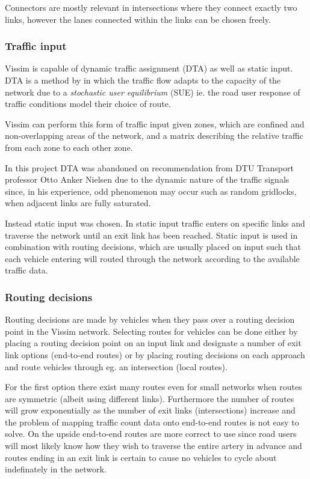 Connectors are mostly relevant in intersections where they connect exactly two links, however the lanes connected within the links can be chosen freely.

\subsubsection*{Traffic input}
Vissim is capable of dynamic traffic assignment (DTA) as well as static input. DTA is a method by \cite{Wardrop} in which the traffic flow adapts to the capacity of the network due to a \textit{stochastic user equilibrium} (SUE) ie. the road user response of traffic conditions model their choice of route. 

Vissim can perform this form of traffic input given zones, which are confined and non-overlapping areas of the network, and a matrix describing the relative traffic from each zone to each other zone.

In this project DTA was abandoned on recommendation from DTU Transport professor Otto Anker Nielsen due to the dynamic nature of the traffic signals since, in his experience, odd phenomenon may occur such as random gridlocks, when adjacent links are fully saturated.

Instead static input was chosen. In static input traffic enters on specific links and traverse the network until an exit link has been reached. Static input is used in combination with routing decisions, which are usually placed on input such that each vehicle entering will routed through the network according to the available traffic data.

\subsubsection*{Routing decisions}
\label{routingdecisions}
Routing decisions are made by vehicles when they pass over a routing decision point in the Vissim network. Selecting routes for vehicles can be done either by placing a routing decision point on an input link and designate a number of exit link options (end-to-end routes) or by placing routing decisions on each approach and route vehicles through eg. an intersection (local routes).

For the first option there exist many routes even for small networks when routes are symmetric (albeit using different links). Furthermore the number of routes will grow exponentially as the number of exit links (intersections) increase and the problem of mapping traffic count data onto end-to-end routes is not easy to solve. On the upside end-to-end routes are more correct to use since road users will most likely know how they wish to traverse the entire artery in advance and routes ending in an exit link is certain to cause no vehicles to cycle about indefinately in the network.

